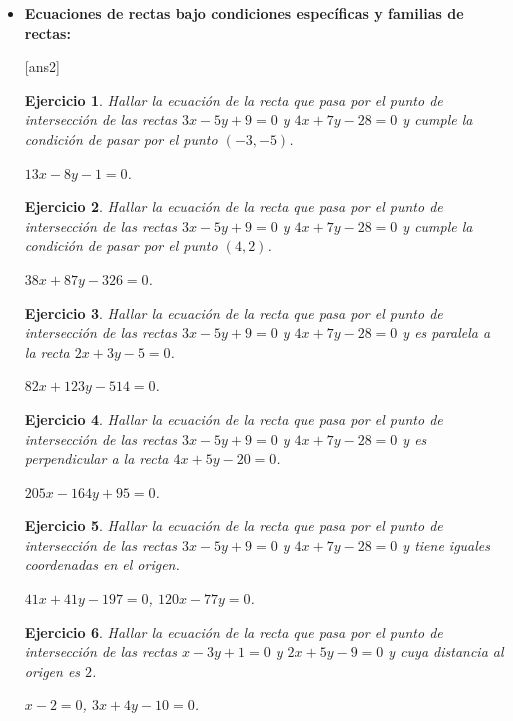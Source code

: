 \documentclass[12pt,a4paper]{article}
\newtheorem{ex}{Ejercicio}
\begin{document}
\begin{itemize}

\vspace{0.3cm}
\item[{\textbf B)}] \textbf{Ecuaciones de rectas bajo condiciones específicas y familias de rectas:}

[ans2] 

\begin{ex}
Hallar la ecuación de la recta que pasa por el punto de intersección de las rectas $3x - 5y + 9 = 0$ y $4x + 7y - 28 = 0$ y cumple la condición de pasar por el punto $(-3, -5)$.
\begin{sol} $13x - 8y - 1 = 0$. \end{sol}
\end{ex}

\begin{ex}
Hallar la ecuación de la recta que pasa por el punto de intersección de las rectas $3x - 5y + 9 = 0$ y $4x + 7y - 28 = 0$ y cumple la condición de pasar por el punto $(4, 2)$.
\begin{sol} $38x + 87y - 326 = 0$. \end{sol}
\end{ex}

\begin{ex}
Hallar la ecuación de la recta que pasa por el punto de intersección de las rectas $3x - 5y + 9 = 0$ y $4x + 7y - 28 = 0$ y es paralela a la recta $2x + 3y - 5 = 0$.
\begin{sol} $82x + 123y - 514 = 0$. \end{sol}
\end{ex}

\begin{ex}
Hallar la ecuación de la recta que pasa por el punto de intersección de las rectas $3x - 5y + 9 = 0$ y $4x + 7y - 28 = 0$ y es perpendicular a la recta $4x + 5y - 20 = 0$.
\begin{sol} $205x - 164y + 95 = 0$. \end{sol}
\end{ex}

\begin{ex}
Hallar la ecuación de la recta que pasa por el punto de intersección de las rectas $3x - 5y + 9 = 0$ y $4x + 7y - 28 = 0$ y tiene iguales coordenadas en el origen.
\begin{sol} $41x + 41y - 197 = 0$, $120x - 77y = 0$. \end{sol}
\end{ex}

\begin{ex}
Hallar la ecuación de la recta que pasa por el punto de intersección de las rectas $x - 3y + 1 = 0$ y $2x + 5y - 9 = 0$ y cuya distancia al origen es $2$.
\begin{sol} $x - 2 = 0$, $3x + 4y - 10 = 0$. \end{sol}
\end{ex}


\end{itemize}
\end{document}
